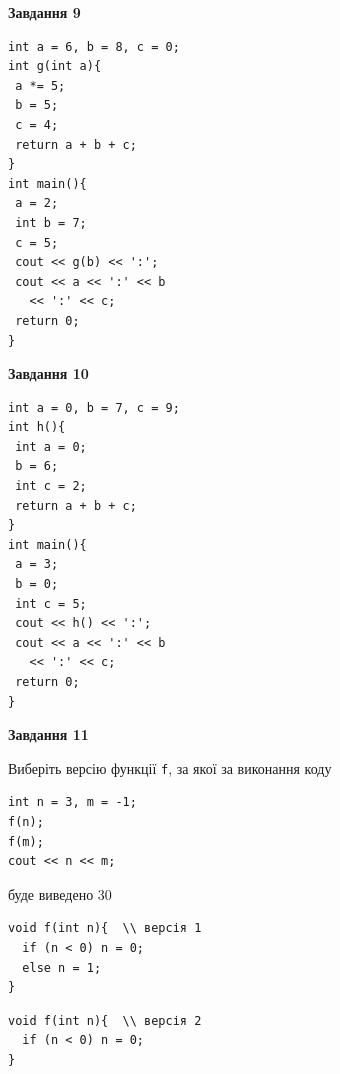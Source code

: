 \documentclass[12pt, ukrainian]{article}
\def\code#1{\Verb!#1!}
\begin{document}
{\begin {large}
\begin{minipage}[t]{11.0cm}
\end{minipage}


\begin{minipage}[t]{7.0cm}

\begin{center}
\textbf{Завдання 9}
\end{center}
\vspace{-8mm}

\begin{verbatim}
int a = 6, b = 8, c = 0;
int g(int a){
 a *= 5;
 b = 5;
 c = 4;
 return a + b + c;
}
int main(){
 a = 2;
 int b = 7;
 c = 5;
 cout << g(b) << ':';
 cout << a << ':' << b 
   << ':' << c;
 return 0;
}
\end{verbatim}



\begin{center}
\textbf{Завдання 10}
\end{center}
\vspace{-8mm}

\begin{verbatim}
int a = 0, b = 7, c = 9;
int h(){
 int a = 0;
 b = 6;
 int c = 2;
 return a + b + c;
}
int main(){
 a = 3;
 b = 0;
 int c = 5;
 cout << h() << ':';
 cout << a << ':' << b 
   << ':' << c;
 return 0;
}
\end{verbatim}

\end{minipage}
\vline \hspace{1mm}
\begin{minipage}[t]{11.0cm}

\begin{center}
\textbf{Завдання 11}
\end{center}
Виберіть версію функції \code{f}, за якої за виконання коду
\begin{verbatim}
int n = 3, m = -1;
f(n);
f(m);
cout << n << m;
\end{verbatim}

буде виведено 30

\begin{verbatim}
void f(int n){  \\ версія 1
  if (n < 0) n = 0;
  else n = 1;
}
\end{verbatim}

\vspace{-8mm}\begin{verbatim}
void f(int n){  \\ версія 2
  if (n < 0) n = 0;
}
\end{verbatim}


\end{minipage}
\end{large}}
\end{document}
